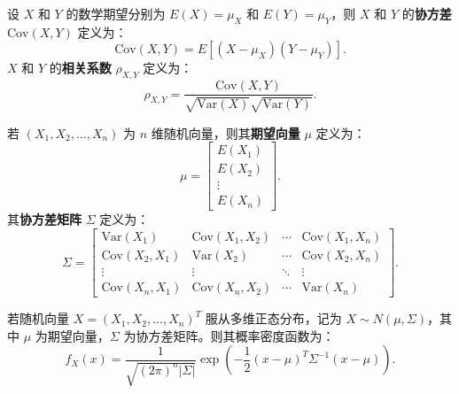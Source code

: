 \documentclass[UTF8]{ctexart}
\begin{document}
	\begin{tcolorbox}[colback=definition!5!white, colframe=definition!75!black, title=协方差及相关系数]
		设 $X$ 和 $Y$ 的数学期望分别为 $E(X) = \mu_X$ 和 $E(Y) = \mu_Y$，则 $X$ 和 $Y$ 的\textbf{协方差} $\text{Cov}(X, Y)$ 定义为：
		\[
		\text{Cov}(X, Y) = E[(X - \mu_X)(Y - \mu_Y)].
		\]
		$X$ 和 $Y$ 的\textbf{相关系数} $\rho_{X,Y}$ 定义为：
		\[
		\rho_{X,Y} = \frac{\text{Cov}(X, Y)}{\sqrt{\text{Var}(X)} \sqrt{\text{Var}(Y)}}.
		\]
	\end{tcolorbox}
	
	\begin{tcolorbox}[colback=definition!5!white, colframe=definition!75!black, title=期望向量和协方差矩阵]
		若 $(X_1, X_2, \dots, X_n)$ 为 $n$ 维随机向量，则其\textbf{期望向量} $\mu$ 定义为：
		\[
		\mu = \begin{bmatrix} E(X_1) \\ E(X_2) \\ \vdots \\ E(X_n) \end{bmatrix}.
		\]
		其\textbf{协方差矩阵} $\Sigma$ 定义为：
		\[
		\Sigma = \begin{bmatrix} 
			\text{Var}(X_1) & \text{Cov}(X_1, X_2) & \cdots & \text{Cov}(X_1, X_n) \\ 
			\text{Cov}(X_2, X_1) & \text{Var}(X_2) & \cdots & \text{Cov}(X_2, X_n) \\ 
			\vdots & \vdots & \ddots & \vdots \\ 
			\text{Cov}(X_n, X_1) & \text{Cov}(X_n, X_2) & \cdots & \text{Var}(X_n) 
		\end{bmatrix}.
		\]
	\end{tcolorbox}
	
	\begin{tcolorbox}[colback=definition!5!white, colframe=definition!75!black, title=多维正态分布]
		若随机向量 $X = (X_1, X_2, \dots, X_n)^T$ 服从多维正态分布，记为 $X \sim N(\mu, \Sigma)$，其中 $\mu$ 为期望向量，$\Sigma$ 为协方差矩阵。则其概率密度函数为：
		\[
		f_X(x) = \frac{1}{\sqrt{(2\pi)^n |\Sigma|}} \exp\left(-\frac{1}{2} (x - \mu)^T \Sigma^{-1} (x - \mu)\right).
		\]
	\end{tcolorbox}
	
\end{document}
